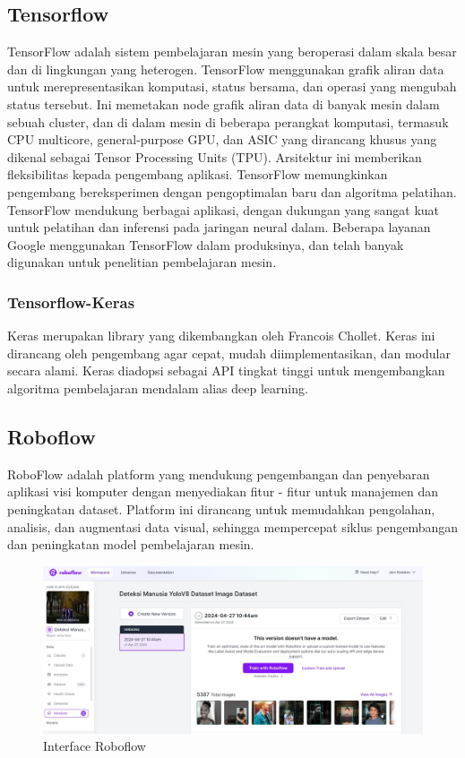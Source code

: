 \subsection{Tensorflow}
TensorFlow adalah sistem pembelajaran mesin yang beroperasi dalam skala besar dan di lingkungan yang heterogen. TensorFlow menggunakan grafik aliran data untuk merepresentasikan komputasi, status bersama, dan operasi yang mengubah status tersebut. Ini memetakan node grafik aliran data di banyak mesin dalam sebuah cluster, dan di dalam mesin di beberapa perangkat komputasi, termasuk CPU multicore, general-purpose GPU, dan ASIC yang dirancang khusus yang dikenal sebagai Tensor Processing Units (TPU). Arsitektur ini memberikan fleksibilitas kepada pengembang aplikasi. TensorFlow memungkinkan pengembang bereksperimen dengan pengoptimalan baru dan algoritma pelatihan. TensorFlow mendukung berbagai aplikasi, dengan dukungan yang sangat kuat untuk pelatihan dan inferensi pada jaringan neural dalam. Beberapa layanan Google menggunakan TensorFlow dalam produksinya, dan telah banyak digunakan untuk penelitian pembelajaran mesin.

\subsubsection{Tensorflow-Keras}
Keras merupakan library yang dikembangkan oleh Francois Chollet. Keras ini dirancang oleh pengembang agar cepat, mudah diimplementasikan, dan modular secara alami. Keras diadopsi sebagai API tingkat tinggi untuk mengembangkan algoritma pembelajaran mendalam alias deep learning. 


\subsection{Roboflow}
RoboFlow adalah platform yang mendukung pengembangan dan penyebaran aplikasi visi komputer dengan menyediakan fitur - fitur untuk manajemen dan peningkatan dataset. Platform ini dirancang untuk memudahkan pengolahan, analisis, dan augmentasi data visual, sehingga mempercepat siklus pengembangan dan peningkatan model pembelajaran mesin.

\begin{figure}[H]
  \centering

  \includegraphics[scale=0.3]{gambar/roboflow.jpg}

  \caption{Interface Roboflow}
  \label{fig:roboflow}
\end{figure}

